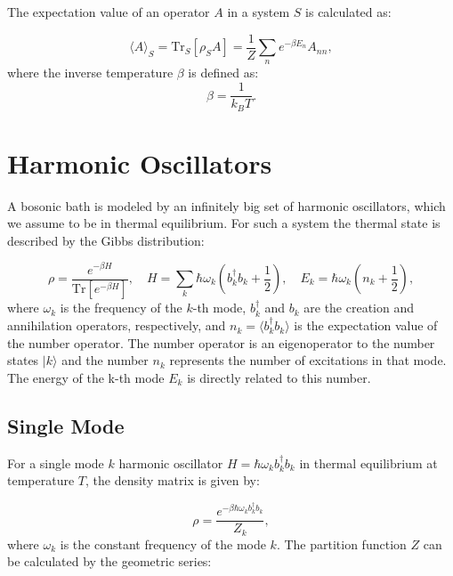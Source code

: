 The expectation value of an operator \( A \) in a system \( S \) is calculated as:

\begin{equation} \label{eq:expectation_value}
	\langle A \rangle_S = \mathrm{Tr}_S[\rho_S A] = \frac{1}{Z} \sum_n e^{-\beta E_n} A_{nn},
\end{equation}
where the inverse temperature \(\beta\) is defined as:
\begin{equation} \label{eq:beta_definition}
	\beta = \frac{1}{k_B T}.
\end{equation}


\section{Harmonic Oscillators}
A bosonic bath is modeled by an infinitely big set of harmonic oscillators, which we assume to be in thermal equilibrium.
For such a system the thermal state is described by the Gibbs distribution:

\begin{equation} \label{eq:gibbs_state}
	\rho = \frac{e^{-\beta H}}{\mathrm{Tr}\left[e^{-\beta H}\right]}, \quad H = \sum_k \hbar \omega_k \left(b_k^{\dagger} b_k + \frac{1}{2}\right), \quad E_k = \hbar \omega_k (n_k + \frac{1}{2}),
\end{equation}
where \( \omega_k \) is the frequency of the \( k \)-th mode, \( b_k^{\dagger} \) and \( b_k \) are the creation and annihilation operators, respectively, and \( n_k = \langle b_k^{\dagger} b_k \rangle \) is the expectation value of the  number operator.
The number operator is an eigenoperator to the number states \(|k\rangle\)
and the number $n_k$ represents the number of excitations in that mode.
The energy of the k-th mode $ E_k $ is directly related to this number.

\subsection{Single Mode}
For a single mode \( k \) harmonic oscillator \( H = \hbar \omega_k b_k^{\dagger} b_k \) in thermal equilibrium at temperature \( T \), the density matrix is given by:

\begin{equation} \label{eq:single_mode_density_matrix}
	\rho = \frac{e^{-\beta \hbar \omega_k b_k^{\dagger} b_k}}{Z_k},
\end{equation}
where \( \omega_k \) is the constant frequency of the mode \( k \).
The partition function \( Z \) can be calculated by the geometric series:

